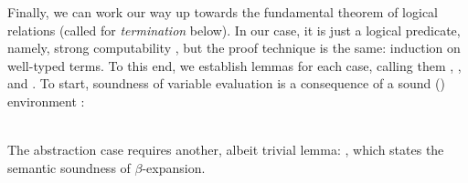 \documentclass[preliminary,copyright,creativecommons]{eptcs}
\newenvironment{code}{\verbatim}{\endverbatim}
\begin{document}
\noindent
Finally, we can work our way up towards the fundamental theorem of
logical relations (called  for \emph{termination} below).
In our case, it is just a logical predicate, namely, strong
computability , but the proof technique is the same:
induction on well-typed terms.
To this end, we establish lemmas for each case, calling them
,
, and
.
To start, soundness of variable evaluation is a consequence of a sound
() environment :
\begin{code}\> \AgdaSymbol{:}   \AgdaSymbol{\}} \AgdaSymbol{(} \AgdaSymbol{:}   \AgdaSymbol{)} \AgdaSymbol{(} \AgdaSymbol{:}   \AgdaSymbol{)}          \AgdaSymbol{(} \AgdaSymbol{(}  \AgdaSymbol{))}\<\\
\>  \<[14]\>[14]\AgdaSymbol{(\_} \AgdaInductiveConstructor{,} \AgdaSymbol{)} \<[23]\>[23]\AgdaSymbol{(\_} \AgdaInductiveConstructor{,} \AgdaSymbol{)} \<[33]\>[33]\AgdaSymbol{=}  \AgdaInductiveConstructor{,}  \AgdaInductiveConstructor{,} \<\\
\>\AgdaSymbol{(} \AgdaSymbol{)} \<[14]\>[14]\AgdaSymbol{(} \AgdaInductiveConstructor{,} \AgdaSymbol{\_)} \<[23]\>[23]\AgdaSymbol{(} \AgdaInductiveConstructor{,} \AgdaSymbol{\_} \AgdaSymbol{)} \<[33]\>[33]\AgdaSymbol{=}    \<\end{code}

\noindent
The abstraction case requires another, albeit trivial lemma:
, which states the semantic soundness of
$\beta$-expansion.
\end{document}
